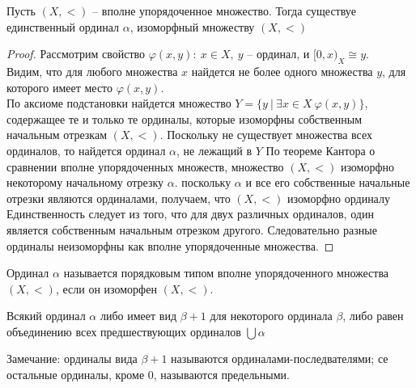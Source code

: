 \begin{theo}[Кантор]
Пусть $(X, <)$ -- вполне упорядоченное множество. Тогда существуе единственный ординал $\alpha$, изоморфный множеству $(X, <)$
\end{theo}
\begin{proof}
Рассмотрим свойство $\varphi(x,y):\ x \in X,\ y$ -- ординал, и $[0,x)_X \cong y$.\\
Видим, что для любого множества $x$ найдется не более одного множества $y$, для которого имеет место $\varphi(x,y)$.\\
По аксиоме подстановки найдется множество $Y = \{y\ |\ \exists x \in X\ \varphi(x,y)\}$, содержащее те и только те ординалы, которые изоморфны собственным начальным отрезкам $(X, <)$.
\vskip 0.1in
Поскольку не существует множества всех ординалов, то найдется ординал $\alpha$, не лежащий в $Y$
\vskip 0.1in
По теореме Кантора о сравнении вполне упорядоченных множеств, множество $(X, <)$ изоморфно некоторому начальному отрезку $\alpha$. поскольку $\alpha$ и все его собственные начальные отрезки являются ординалами, получаем, что $(X, <)$ изоморфно ординалу
\vskip 0.1in
Единственность следует из того, что для двух различных ординалов, один является собственным начальным отрезком другого. Следовательно разные ординалы неизоморфны как вполне упорядоченные множества.
\end{proof}

\begin{defn}
Ординал $\alpha$ называется порядковым типом вполне упорядоченного множества $(X, <)$, если он изоморфен $(X, <)$.
\end{defn}

\begin{lem}
Всякий ординал $\alpha$ либо имеет вид $\beta + 1$ для некоторого ординала $\beta$, либо равен объединению всех предшествующих ординалов $\bigcup \alpha$
\end{lem}

Замечание: ординалы вида $\beta + 1$ называются ординалами-последвателями; се остальные ординалы, кроме 0, называются предельными.